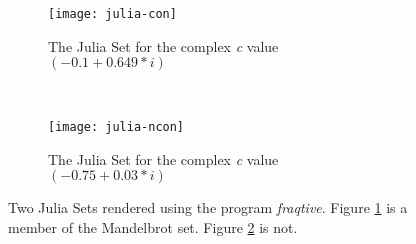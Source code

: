 \begin{figure}[h]
  \centering
  \begin{subfigure}[b]{0.48\textwidth}
    \centering    
    \texttt{[image: julia-con]}
    \caption{
      \tiny The Julia Set for the complex \textit{c} value 
      \begin{math}
        (-0.1 + 0.649*i)
      \end{math}
    }
    \label{fig:juliaimgcon}
  \end{subfigure}
  ~ %
  \begin{subfigure}[b]{0.48\textwidth}
    \centering
    \texttt{[image: julia-ncon]}
    \caption{
      \tiny The Julia Set for the complex \textit{c} value 
      \begin{math}
        (-0.75 + 0.03*i)
      \end{math}
    }
    \label{fig:juliaimgncon}
  \end{subfigure}
  \caption{
    Two Julia Sets rendered using the program \textit{fraqtive}. 
    Figure \ref{fig:juliaimgcon} is a member of the Mandelbrot set. 
    Figure \ref{fig:juliaimgncon} is not.
  }
  \label{fig:juliaimgs}
\end{figure}
